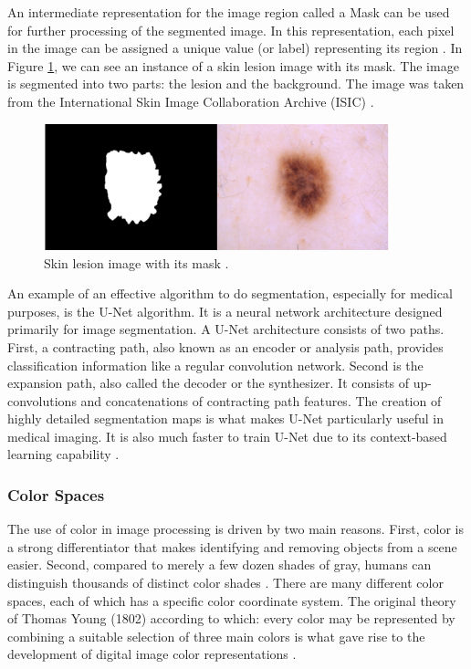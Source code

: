 \documentclass[12pt]{diazessay}
\begin{document}
    An intermediate representation for the image region called a Mask can be used for further processing of the segmented image. In this representation, each pixel in the image can be assigned a unique value (or label) representing its region \cite{Stockman2001-vr}. In Figure \ref{fig:segmented-mask}, we can see an instance of a skin lesion image with its mask. The image is segmented into two parts: the lesion and the background. The image was taken from the International Skin Image Collaboration Archive (ISIC) \cite{ISICdataset}.
    \begin{figure}[htp]
        \centering
        \includegraphics[width=10cm]{Figures/segmented-mask.png}
        \caption[Skin lesion image with its mask]{Skin lesion image with its mask \cite{ISICdataset}.}
        \label{fig:segmented-mask}
    \end{figure}
    \newpage
    \hspace{0.7cm}An example of an effective algorithm to do segmentation, especially for medical purposes, is the U-Net algorithm. It is a neural network architecture designed primarily for image segmentation. A U-Net architecture consists of two paths. First, a contracting path, also known as an encoder or analysis path, provides classification information like a regular convolution network. Second is the expansion path, also called the decoder or the synthesizer. It consists of up-convolutions and concatenations of contracting path features. The creation of highly detailed segmentation maps is what makes U-Net particularly useful in medical imaging. It is also much faster to train U-Net due to its context-based learning capability \cite{siddique2021u}. 
    
    \subsubsection{Color Spaces}
    \hspace{0.7cm} The use of color in image processing is driven by two main reasons. First, color is a strong differentiator that makes identifying and removing objects from a scene easier. Second, compared to merely a few dozen shades of gray, humans can distinguish thousands of distinct color shades \cite{Gonzalez2001-hg}. There are many different color spaces, each of which has a specific color coordinate system. The original theory of Thomas Young (1802) according to which: every color may be represented by combining a suitable selection of three main colors is what gave rise to the development of digital image color representations \cite{Jain1988-vj}.
    
\end{document}
